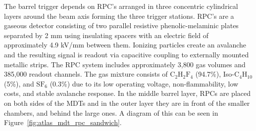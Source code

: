 
The barrel trigger depends on RPC's arranged in three concentric cylindrical layers around the beam axis forming the three trigger stations. RPC's are a gaseous detector consisting of two parallel resistive phenolic-melaminic plates separated by 2 mm using insulating spacers with an electric field of approximately 4.9 kV/mm between them. Ionizing particles create an avalanche and the resulting signal is readout via capacitive coupling to externally mounted metallic strips. The RPC system includes approximately 3,800 gas volumes and 385,000 readout channels. The gas mixture consists of $\mathrm{C_{2}H_{2}F_{4}}$ (94.7\%), Iso-$\mathrm{C_{4}H_{10}}$ (5\%), and $\mathrm{SF}_6$ (0.3\%) due to its low operating voltage, non-flammability, low costs, and stable avalanche response. In the middle barrel layer, RPCs are placed on both sides of the MDTs and in the outer layer they are in front of the smaller chambers, and behind the large ones. A diagram of this can be seen in Figure~\ref{fig:atlas_mdt_rpc_sandwich}.

